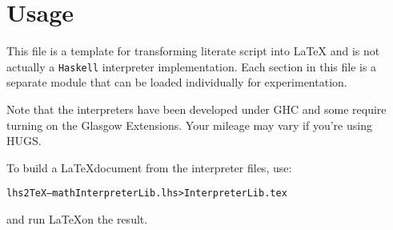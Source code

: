 \documentclass[10pt]{article}
\begin{document}
\section{Usage}

This file is a template for transforming literate script into \LaTeX
and is not actually a \texttt{Haskell} interpreter implementation.
Each section in this file is a separate module that can be loaded
individually for experimentation.

Note that the interpreters have been developed under GHC and some
require turning on the Glasgow Extensions.  Your mileage may vary if
you're using HUGS.

To build a \LaTeX document from the interpreter files, use:

\begin{alltt}
   lhs2TeX --math InterpreterLib.lhs > InterpreterLib.tex
\end{alltt}

and run \LaTeX on the result.


\end{document}
